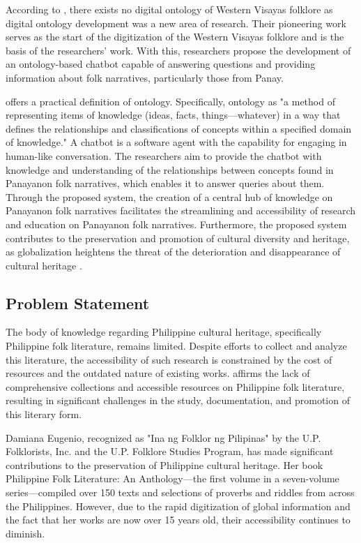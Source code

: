     According to \cite{dimzon2015}, there exists no digital ontology of Western Visayas folklore as digital ontology development was a new area of research. Their pioneering work serves as the start of the digitization of the Western Visayas folklore and is the basis of the researchers’ work. 
    With this, researchers propose the development of an ontology-based chatbot capable of answering questions and providing information about folk narratives, particularly those from Panay. 
    
      offers a practical definition of ontology. Specifically, ontology as "a method of representing items of knowledge (ideas, facts, things—whatever) in a way that defines the relationships and classifications of concepts within a specified domain of knowledge." A chatbot is a software agent with the capability for engaging in human-like conversation. The researchers aim to provide the chatbot with knowledge and understanding of the relationships between concepts found in Panayanon folk narratives, which enables it to answer queries about them. Through the proposed system, the creation of a central hub of knowledge on Panayanon folk narratives facilitates the streamlining and accessibility of research and education on Panayanon folk narratives. Furthermore, the proposed system contributes to the preservation and promotion of cultural diversity and heritage, as globalization heightens the threat of the deterioration and disappearance of cultural heritage \cite{UNESCO_2001}. 

\subsection{Problem Statement}
\label{subsec:probstatement}
The body of knowledge regarding Philippine cultural heritage, specifically Philippine folk literature, remains limited. Despite efforts to collect and analyze this literature, the accessibility of such research is constrained by the cost of resources and the outdated nature of existing works.  affirms the lack of comprehensive collections and accessible resources on Philippine folk literature, resulting in significant challenges in the study, documentation, and promotion of this literary form.  

Damiana Eugenio, recognized as "Ina ng Folklor ng Pilipinas" by the U.P. Folklorists, Inc. and the U.P. Folklore Studies Program, has made significant contributions to the preservation of Philippine cultural heritage. Her book Philippine Folk Literature: An Anthology—the first volume in a seven-volume series—compiled over 150 texts and selections of proverbs and riddles from across the Philippines. However, due to the rapid digitization of global information and the fact that her works are now over 15 years old, their accessibility continues to diminish.


